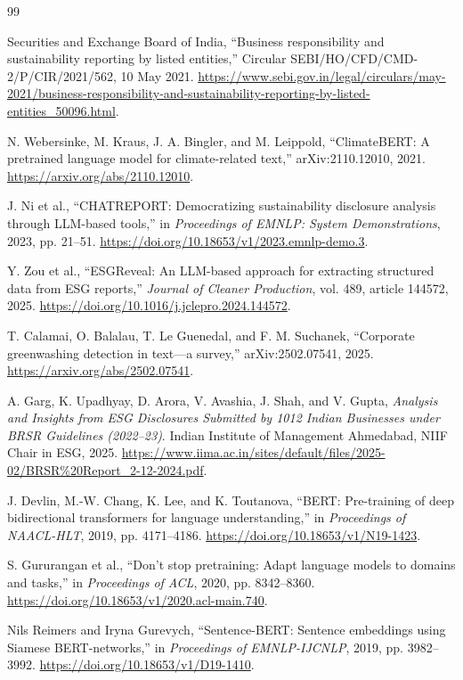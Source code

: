 \begin{thebibliography}{99}
\small
\raggedright
\setlength{\itemsep}{5pt}
\setlength{\parskip}{0pt}

Securities and Exchange Board of India, ``Business responsibility and sustainability reporting by listed entities,'' Circular SEBI/HO/CFD/CMD-2/P/CIR/2021/562, 10 May 2021. \url{https://www.sebi.gov.in/legal/circulars/may-2021/business-responsibility-and-sustainability-reporting-by-listed-entities_50096.html}.

N. Webersinke, M. Kraus, J. A. Bingler, and M. Leippold, ``ClimateBERT: A pretrained language model for climate-related text,'' arXiv:2110.12010, 2021. \url{https://arxiv.org/abs/2110.12010}.

J. Ni et al., ``CHATREPORT: Democratizing sustainability disclosure analysis through LLM-based tools,'' in \emph{Proceedings of EMNLP: System Demonstrations}, 2023, pp. 21--51. \url{https://doi.org/10.18653/v1/2023.emnlp-demo.3}.

Y. Zou et al., ``ESGReveal: An LLM-based approach for extracting structured data from ESG reports,'' \emph{Journal of Cleaner Production}, vol. 489, article 144572, 2025. \url{https://doi.org/10.1016/j.jclepro.2024.144572}.

T. Calamai, O. Balalau, T. Le Guenedal, and F. M. Suchanek, ``Corporate greenwashing detection in text---a survey,'' arXiv:2502.07541, 2025. \url{https://arxiv.org/abs/2502.07541}.

A. Garg, K. Upadhyay, D. Arora, V. Avashia, J. Shah, and V. Gupta, \emph{Analysis and Insights from ESG Disclosures Submitted by 1012 Indian Businesses under BRSR Guidelines (2022--23)}. Indian Institute of Management Ahmedabad, NIIF Chair in ESG, 2025. \url{https://www.iima.ac.in/sites/default/files/2025-02/BRSR%20Report_2-12-2024.pdf}.

J. Devlin, M.-W. Chang, K. Lee, and K. Toutanova, ``BERT: Pre-training of deep bidirectional transformers for language understanding,'' in \emph{Proceedings of NAACL-HLT}, 2019, pp. 4171--4186. \url{https://doi.org/10.18653/v1/N19-1423}.

S. Gururangan et al., ``Don't stop pretraining: Adapt language models to domains and tasks,'' in \emph{Proceedings of ACL}, 2020, pp. 8342--8360. \url{https://doi.org/10.18653/v1/2020.acl-main.740}.

Nils Reimers and Iryna Gurevych, ``Sentence-BERT: Sentence embeddings using Siamese BERT-networks,'' in \emph{Proceedings of EMNLP-IJCNLP}, 2019, pp. 3982--3992. \url{https://doi.org/10.18653/v1/D19-1410}.


\end{thebibliography}
